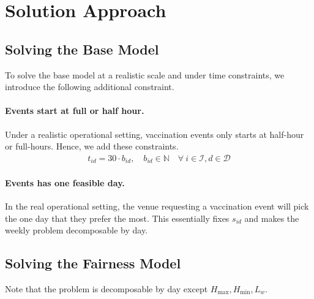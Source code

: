 \section{Solution Approach}

\subsection{Solving the Base Model}
To solve the base model at a realistic scale and under time constraints, we introduce the following additional constraint.

\paragraph{Events start at full or half hour.} Under a realistic operational setting, vaccination events only starts at half-hour or full-hours. Hence, we add these constraints.
\begin{align}
    t_{id} = 30 \cdot b_{id}, \quad b_{id} \in \mathbb{N} \quad \forall \ i\in\mathcal{I}, d\in\mathcal{D}
\end{align}

\paragraph{Events has one feasible day.} In the real operational setting, the venue requesting a vaccination event will pick the one day that they prefer the most. This essentially fixes $s_{id}$ and makes the weekly problem decomposable by day. 

\subsection{Solving the Fairness Model}
Note that the problem is decomposable by day except $H_{\max}, H_{\min}, L_w$. 


